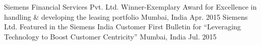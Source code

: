 \begin{cventries}
  \cventry
    {Siemens Financial Services Pvt. Ltd.} %
    {Winner-Exemplary Award for Excellence in handling \& developing the leasing portfolio} %
    {Mumbai, India} %
    {Apr. 2015} %
    {
    } 
    {\vspace{-2.0mm}}
  \cventry
    {Siemens Ltd.} %
    {Featured in the Siemens India Customer First Bulletin for “Leveraging Technology to Boost Customer Centricity”} %
    {Mumbai, India} %
    {Jul. 2015} %
    {
    } 

\end{cventries}
